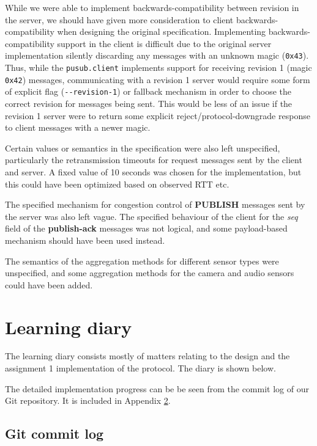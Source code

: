 \documentclass[a4paper]{article}
\begin{document}
While we were able to implement backwards-compatibility between revision in the server, we should have given more consideration to client backwards-compatibility when designing the original specification.
Implementing backwards-compatibility support in the client is difficult due to the original server implementation silently discarding any messages with an unknown magic (\texttt{0x43}).
Thus, while the \texttt{pusub.client} implements support for receiving revision 1 (magic \texttt{0x42}) messages, communicating with a revision 1 server would require some form of explicit flag (\texttt{\--\--revision-1}) or fallback mechanism in order to choose the correct revision for messages being sent.
This would be less of an issue if the revision 1 server were to return some explicit reject/protocol-downgrade response to client messages with a newer magic.

Certain values or semantics in the specification were also left unspecified, particularly the retransmission timeouts for request messages sent by the client and server. A fixed value of 10 seconds was chosen for the implementation, but this could have been optimized based on observed RTT etc.

The specified mechanism for congestion control of \textbf{PUBLISH} messages sent by the server was also left vague.
The specified behaviour of the client for the \textit{seq} field of the \textbf{publish-ack} messages was not logical, and some payload-based mechanism should have been used instead.

The semantics of the aggregation methods for different sensor types were unspecified, and some aggregation methods for the camera and audio sensors could have been added. 

\section{Learning diary}
The learning diary consists mostly of matters relating to the design and the
assignment 1 implementation of the protocol. The diary is shown below.

The detailed implementation progress can be be seen from the commit log of our
Git repository. It is included in Appendix \ref{lst:commit_log}.



\clearpage
\begin{appendices}
  \section{Git commit log}\label{lst:commit_log}
  
\end{appendices}
\end{document}
